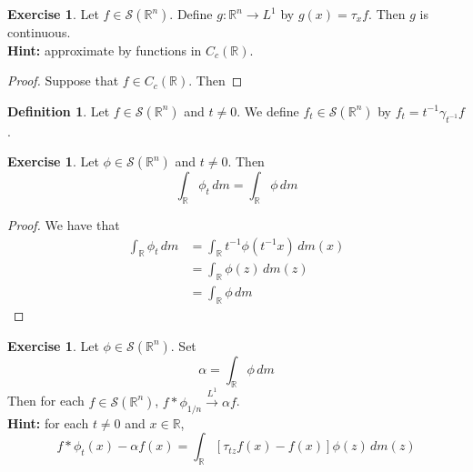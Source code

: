 \documentclass{book}
\theoremstyle{definition}
\newtheorem{defn}[definition]{Definition}
\newtheorem{ex}[definition]{Exercise}
\newcommand{\al}{\alpha}
\newcommand{\gam}{\gamma}
\newcommand{\R}{\mathbb{R}}
\newcommand{\MS}{\mathcal{S}}
\DeclareMathOperator*{\0}{\mbf{0}}
\DeclareMathOperator*{\1}{\mbf{1}}
\newcommand{\conv}[1]{\xrightarrow{#1}}
\newcommand{\dm}{\, d m}
\begin{document}
	\begin{ex}
		Let $f \in \MS(\R^n)$. Define $g: \R^n \rightarrow L^1$ by $g(x) = \tau_x f$. Then $g$ is continuous. \\
		\textbf{Hint:} approximate by functions in $C_c(\R)$.
	\end{ex}

	\begin{proof}
		Suppose that $f \in C_c(\R)$. Then
	\end{proof}

	\begin{defn}
		Let $f \in \MS(\R^n)$ and $t \neq 0$. We define $f_t \in \MS(\R^n)$ by $f_t = t^{-1} \gam_{t^{-1}} f$.   
	\end{defn}

	\begin{ex}
		Let $\phi \in \MS(\R^n)$ and $t \neq 0$. Then 
		$$\int_{\R}\phi_t \dm = \int_{\R} \phi \dm$$ 
	\end{ex}

	\begin{proof}
		We have that 
		\begin{align*}
			\int_{\R}\phi_t \dm 
			& = \int_{\R}t^{-1}\phi(t^{-1}x) \dm(x) \\
			& = \int_{\R} \phi(z) \dm(z) \\
			& = \int_{\R}\phi \dm 
		\end{align*}
	\end{proof}

	\begin{ex}
		Let $\phi \in \MS(\R^n)$. Set 
		$$\al = \int_{\R} \phi \dm$$ 
		Then for each $f \in \MS(\R^n)$,  $f * \phi_{1/n} \conv{L^1} \al f$. \\
		\textbf{Hint:} for each $t \neq 0$ and $x \in \R$, 
		$$f * \phi_t(x) - \al f(x) = \int_{\R} [\tau_{tz}f(x)  -  f(x)] \phi(z) \dm(z) $$
	\end{ex}
\end{document}
